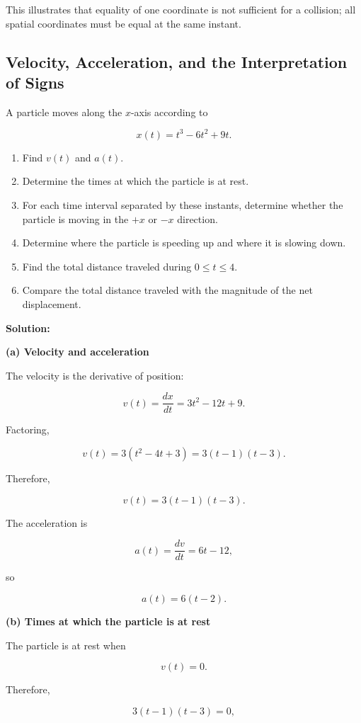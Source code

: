 \documentclass[../main.tex]{subfiles}
\theoremstyle{remark}
\begin{document}
This illustrates that equality of one coordinate is not sufficient for a collision; all spatial coordinates must be equal at the same instant.


\subsection{Velocity, Acceleration, and the Interpretation of Signs}

A particle moves along the \(x\)-axis according to

\[
x(t)=t^3-6t^2+9t.
\]

\begin{enumerate}
    \item Find \(v(t)\) and \(a(t)\).
    \item Determine the times at which the particle is at rest.
    \item For each time interval separated by these instants, determine whether the particle is moving in the \(+x\) or \(-x\) direction.
    \item Determine where the particle is speeding up and where it is slowing down.
    \item Find the total distance traveled during \(0\leq t\leq 4\).
    \item Compare the total distance traveled with the magnitude of the net displacement.
\end{enumerate}

\textbf{Solution:}

\textbf{(a) Velocity and acceleration}

The velocity is the derivative of position:

\[
v(t)=\frac{dx}{dt}
=
3t^2-12t+9.
\]

Factoring,

\[
v(t)=3(t^2-4t+3)
=
3(t-1)(t-3).
\]

Therefore,

\[
\boxed{
v(t)=3(t-1)(t-3).
}
\]

The acceleration is

\[
a(t)=\frac{dv}{dt}
=
6t-12,
\]

so

\[
\boxed{
a(t)=6(t-2).
}
\]

\textbf{(b) Times at which the particle is at rest}

The particle is at rest when

\[
v(t)=0.
\]

Therefore,

\[
3(t-1)(t-3)=0,
\]
\end{document}
